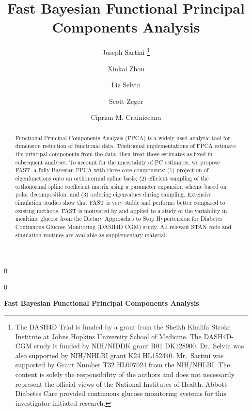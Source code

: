 \documentclass[12pt]{article}
\newcommand{\blind}{0}
\begin{document}
\def\spacingset#1{\renewcommand{\baselinestretch}%
{#1}\small\normalsize} \spacingset{1}

\blind
{
  \title{\bf Fast Bayesian Functional Principal Components Analysis}
  \author[1]{Joseph Sartini \thanks{The DASH4D Trial is funded by a grant from the Sheikh Khalifa Stroke Institute at Johns Hopkins University School of Medicine. The DASH4D-CGM study is funded by NIH/NIDDK grant R01 DK128900. Dr.~Selvin was also supported by NIH/NHLBI grant K24 HL152440. Mr.~Sartini was supported by Grant Number T32 HL007024 from the NIH/NHLBI. The content is solely the responsibility of the authors and does not necessarily represent the official views of the National Institutes of Health. Abbott Diabetes Care provided continuous glucose monitoring systems for this investigator-initiated research.}}
  \author[1]{Xinkai Zhou}
  \author[2]{Liz Selvin}
  \author[1]{Scott Zeger}
  \author[1]{Ciprian M. Crainiceanu}
  \maketitle
} \fi

\blind
{
  \bigskip
  \bigskip
  \bigskip
  \begin{center}
    {\LARGE\bf Fast Bayesian Functional Principal Components Analysis}
\end{center}
  \medskip
} \fi

\bigskip

\begin{abstract}
Functional Principal Components Analysis (FPCA) is a widely used analytic tool for dimension reduction of functional data. Traditional implementations of FPCA estimate the principal components from the data, then treat these estimates as fixed in subsequent analyses. To account for the uncertainty of PC estimates, we propose FAST,  a fully-Bayesian FPCA with three core components: (1) projection of eigenfunctions onto an orthonormal spline basis; (2) efficient sampling of the orthonormal spline coefficient matrix using a parameter expansion scheme based on polar decomposition; and (3) ordering eigenvalues during sampling. Extensive simulation studies show that FAST is very stable and performs better compared to existing methods. FAST is motivated by and applied to a study of the variability in mealtime glucose from the Dietary Approaches to Stop Hypertension for Diabetes Continuous Glucose Monitoring (DASH4D CGM) study. All relevant STAN code and simulation routines are available as supplementary material.
\end{abstract}
\end{document}
